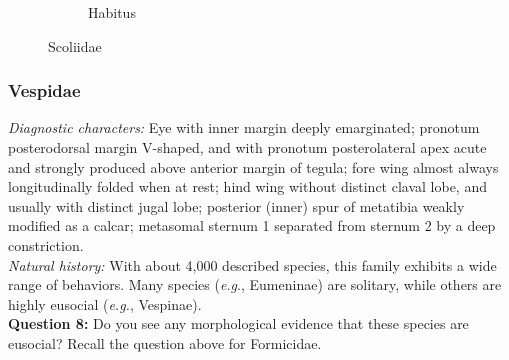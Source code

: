 \documentclass[letterpaper, 11pt]{article}
\begin{document}
\begin{figure}[ht!]
\begin{subfigure}[ht!]{0.38\textwidth}
        \caption{Habitus \citep[][Fig. 78]{goulet1993hymenoptera}}
        \label{fig:scoliid2}
    \end{subfigure}
    \caption{Scoliidae}\label{fig:scoliids}
\end{figure}

\subsubsection{Vespidae}
\noindent{}\textit{Diagnostic characters:} Eye with inner margin deeply emarginated; pronotum posterodorsal margin V-shaped, and with pronotum posterolateral apex acute and strongly produced above anterior margin of tegula; fore wing almost always longitudinally folded when at rest; hind wing without distinct claval lobe, and usually with distinct jugal lobe; posterior (inner) spur of metatibia weakly modified as a calcar; metasomal sternum 1 separated from sternum 2 by a deep constriction.\\

\noindent{}\textit{Natural history:} With about 4,000 described species, this family exhibits a wide range of behaviors. Many species (\textit{e.g}., Eumeninae) are solitary, while others are highly eusocial (\textit{e.g.}, Vespinae). \\

\noindent\textbf{Question 8:} Do you see any morphological evidence that these species are eusocial? Recall the question above for Formicidae.\vspace{2cm}
\end{document}
